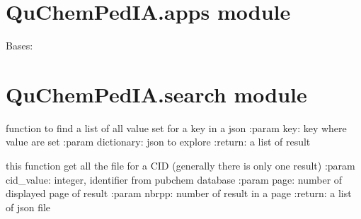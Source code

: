 \documentclass[letterpaper,10pt,english]{sphinxmanual}
\begin{document}
\chapter{QuChemPedIA.apps module}
\label{\detokenize{QuChemPedIA:module-QuChemPedIA.apps}}\label{\detokenize{QuChemPedIA:quchempedia-apps-module}}

\begin{fulllineitems}
\label{\detokenize{QuChemPedIA:QuChemPedIA.apps.QuchempediaConfig}}
Bases: 

\begin{fulllineitems}
\label{\detokenize{QuChemPedIA:QuChemPedIA.apps.QuchempediaConfig.name}}
\end{fulllineitems}


\end{fulllineitems}



\chapter{QuChemPedIA.search module}
\label{\detokenize{QuChemPedIA:module-QuChemPedIA.search}}\label{\detokenize{QuChemPedIA:quchempedia-search-module}}

\begin{fulllineitems}
\label{\detokenize{QuChemPedIA:QuChemPedIA.search.find}}
function to find a list of all value set for a key in a json
:param key: key where value are set
:param dictionary: json to explore
:return: a list of result

\end{fulllineitems}


\begin{fulllineitems}
\label{\detokenize{QuChemPedIA:QuChemPedIA.search.search_cid}}
this function get all the file for a CID (generally there is only one result)
:param cid\_value: integer, identifier from pubchem database
:param page: number of displayed page of result
:param nbrpp: number of result in a page
:return: a list of json file

\end{fulllineitems}
\end{document}
